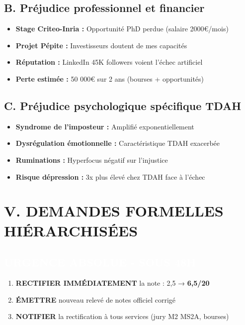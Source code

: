\documentclass[12pt,french]{scrlttr2}
\begin{document}
\begin{letter}
\subsection*{B. Préjudice professionnel et financier}
\begin{itemize}[leftmargin=*]
\item \textbf{Stage Criteo-Inria :} Opportunité PhD perdue (salaire 2000€/mois)
\item \textbf{Projet Pépite :} Investisseurs doutent de mes capacités
\item \textbf{Réputation :} LinkedIn 45K followers voient l'échec artificiel
\item \textbf{Perte estimée :} 50 000€ sur 2 ans (bourses + opportunités)
\end{itemize}

\subsection*{C. Préjudice psychologique spécifique TDAH}
\begin{itemize}[leftmargin=*]
\item \textbf{Syndrome de l'imposteur :} Amplifié exponentiellement
\item \textbf{Dysrégulation émotionnelle :} Caractéristique TDAH exacerbée
\item \textbf{Ruminations :} Hyperfocus négatif sur l'injustice
\item \textbf{Risque dépression :} 3x plus élevé chez TDAH face à l'échec
\end{itemize}

\section*{V. DEMANDES FORMELLES HIÉRARCHISÉES}

\subsection*{\colorbox{red!30}{\textcolor{white}{\textbf{URGENCE ABSOLUE - SOUS 48H}}}}

\begin{enumerate}
\item \textbf{RECTIFIER IMMÉDIATEMENT} la note : 2,5 → \colorbox{green!30}{\textbf{6,5/20}}
\item \textbf{ÉMETTRE} nouveau relevé de notes officiel corrigé
\item \textbf{NOTIFIER} la rectification à tous services (jury M2 MS2A, bourses)
\end{enumerate}


\end{letter}
\end{document}
